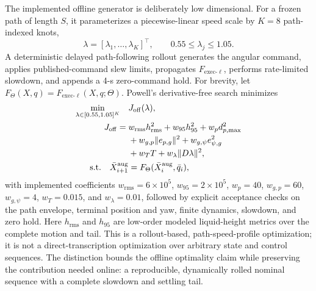 The implemented offline generator is deliberately low dimensional.  For a
frozen path of length $S$, it parameterizes a piecewise-linear speed scale by
$K=8$ path-indexed knots,
\begin{equation}
  \lambda=[\lambda_1,\ldots,\lambda_K]^\top,
  \qquad 0.55\le\lambda_j\le1.05.
  \label{eq:base_ocp_state}
\end{equation}
A deterministic delayed path-following rollout generates the angular command,
applies published-command slew limits, propagates
$F_{\mathrm{exec}\text{-}\ell}$, performs rate-limited slowdown, and appends a
4-s zero-command hold.  For brevity, let
$F_\Theta(X,q)=F_{\mathrm{exec}\text{-}\ell}(X,q;\Theta)$.
Powell's derivative-free search minimizes
\begin{subequations}
\label{eq:offline_ocp_contract}
\begin{align}
  \min_{\lambda\in[0.55,1.05]^K}\quad &J_{\mathrm{off}}(\lambda),
  \notag\\
  J_{\mathrm{off}}={}&
  w_{\mathrm{rms}}h_{\mathrm{rms}}^2+
  w_{95}h_{95}^2+w_p d_{p,\max}^2
  \notag\\[-0.3ex]
  &+w_{g,p}\|e_{p,g}\|^2+w_{g,\psi}e_{\psi,g}^2
  \notag\\[-0.3ex]
  &+w_TT+w_\lambda\|D\lambda\|^2,
  \label{eq:offline_ocp_objective}\\
  \text{s.t.}\quad
  \bar X^{\mathrm{aug}}_{i+1}&=
  F_\Theta(\bar X^{\mathrm{aug}}_i,\bar q_i),
  \label{eq:offline_ocp_dynamics}
\end{align}
\end{subequations}
with implemented coefficients
$w_{\mathrm{rms}}=6\!\times\!10^5$,
$w_{95}=2\!\times\!10^5$, $w_p=40$, $w_{g,p}=60$,
$w_{g,\psi}=4$, $w_T=0.015$, and $w_\lambda=0.01$,
followed by explicit acceptance checks on the path envelope, terminal position
and yaw, finite dynamics, slowdown, and zero hold.  Here $h_{\mathrm{rms}}$
and $h_{95}$ are low-order modeled liquid-height metrics over the complete
motion and tail.  This is a rollout-based, path-speed-profile optimization;
it is not a direct-transcription optimization over arbitrary state and control
sequences.  The distinction bounds the offline optimality claim while
preserving the contribution needed online: a reproducible, dynamically rolled
nominal sequence with a complete slowdown and settling tail.

